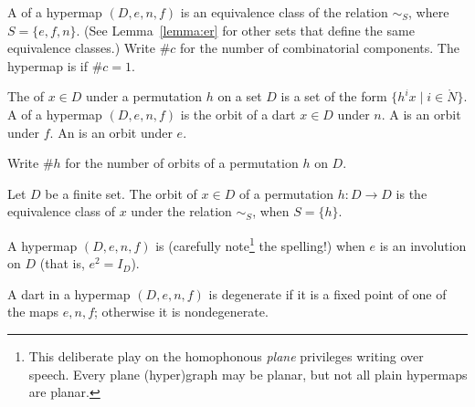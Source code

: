 \begin{definition}
A  of a hypermap $(D,e,n,f)$ is an 
equivalence class of the relation $\sim_S$, where
$S=\{e,f,n\}$. 
(See Lemma~\ref{lemma:er} for other sets that define the same equivalence classes.)  
Write $\#c$ for the
number of combinatorial components.  The hypermap is  if
$\#c=1$.  %
%
%
%
%
\end{definition}





\begin{definition} The  of $x\in D$ under a permutation $h$ on
a set $D$ is a set of the form $\{h^i x\mid i\in\ring{N}\}$.  A 
of a hypermap $(D,e,n,f)$ is the orbit of a dart $x\in D$ under $n$.  
A  is an orbit under $f$.  
An  is an
orbit under $e$.  %
%
%
\end{definition}

Write $\#h$ for the
number of orbits of a permutation $h$ on $D$.  
%
%


\begin{lemma}
Let $D$ be a finite set.  The orbit of $x\in D$ of a permutation $h:D\to D$
is the equivalence class of $x$ under the relation $\sim_S$, when $S=\{h\}$.
\end{lemma}

\begin{definition}[plain] A hypermap $(D,e,n,f)$ is 
  (carefully note\footnote{This deliberate play on the homophonous
    {\it plane} privileges writing over speech.  Every plane (hyper)graph may
be planar, but not all plain hypermaps are planar.}
  the  spelling!) when $e$ is an involution on $D$ (that is, $e^2 = I_D$).
\end{definition}




\begin{definition}[degenerate] A dart in a hypermap $(D,e,n,f)$ 
is degenerate if it is a
fixed point of one of the maps $e,n,f$; otherwise it is nondegenerate.  
%
%
\end{definition}

